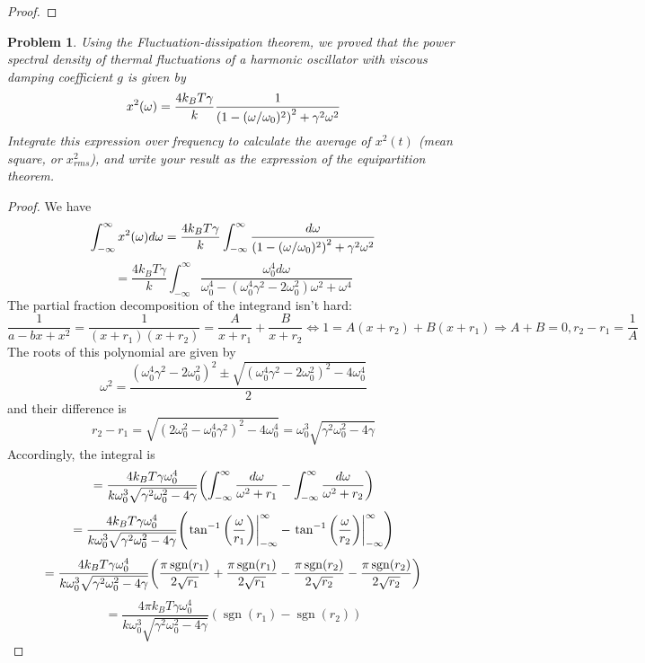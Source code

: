 \documentclass{article}
\newtheorem{plm}{Problem}
\DeclareMathOperator{\sgn}{sgn}
\begin{document}
\begin{proof}

\end{proof}

\begin{plm}
  Using the Fluctuation-dissipation theorem, we proved that the power spectral density of
  thermal fluctuations of a harmonic oscillator with viscous damping coefficient $g$ is given by
  \[
    x^{2}(\omega) = \frac{4k_{B}T\gamma}{k}\frac{1}{\qty(1 - (\omega / \omega_{0})^{2})^{2} + \gamma^{2}\omega^{2}}
  \]
  Integrate this expression over frequency to calculate the average of $x^{2}(t)$ (mean square, or $x^{2}_{rms}$),
  and write your result as the expression of the equipartition theorem.
\end{plm}

\begin{proof}
  We have
  \[
    \int_{-\infty}^{\infty}x^{2}(\omega)d\omega
    = \frac{4k_{B}T\gamma}{k}\int_{-\infty}^{\infty}\frac{d\omega}{\qty(1-(\omega/\omega_{0})^{2})^{2}+\gamma^{2}\omega^{2}}
  \]
  \[
    = \frac{4k_{B}T\gamma}{k}\int_{-\infty}^{\infty}\frac{\omega_{0}^{4}d\omega}{\omega_{0}^{4}
      - (\omega_{0}^{4}\gamma^{2}-2\omega_{0}^{2})\omega^{2} + \omega^{4}}
  \]
  The partial fraction decomposition of the integrand isn't hard:
  \[
    \frac{1}{a-bx+x^{2}} = \frac{1}{(x + r_{1})(x + r_{2})} = \frac{A}{x + r_{1}} + \frac{B}{x + r_{2}}
    \Leftrightarrow 1 = A(x+r_{2}) + B(x + r_{1}) \Rightarrow A+B = 0, r_{2}-r_{1} = \frac{1}{A}
  \]
  The roots of this polynomial are given by
  \[
    \omega^{2} = \frac{(\omega_{0}^{4}\gamma^{2} - 2\omega_{0}^{2})^{2} \pm \sqrt{(\omega_{0}^{4}\gamma^{2}-2\omega_{0}^{2})^{2}
        - 4\omega_{0}^{4}}}{2}
  \]
  and their difference is
  \[
    r_{2} - r_{1} =\sqrt{(2\omega_{0}^{2}-\omega_{0}^{4}\gamma^{2})^{2} - 4\omega_{0}^{4}} = \omega_{0}^{3}\sqrt{\gamma^{2}\omega_{0}^{2}-4\gamma}
  \]
  Accordingly, the integral is
  \[
    = \frac{4k_{B}T\gamma\omega_{0}^{4}}{k\omega_{0}^{3}\sqrt{\gamma^{2}\omega_{0}^{2}-4\gamma}}
    \qty(\int_{-\infty}^{\infty}\frac{d\omega}{\omega^{2} + r_{1}}
    - \int_{-\infty}^{\infty}\frac{d\omega}{\omega^{2} + r_{2}})
  \]
  \[
    = \frac{4k_{B}T\gamma\omega_{0}^{4}}{k\omega_{0}^{3}\sqrt{\gamma^{2}\omega_{0}^{2}-4\gamma}}
    \qty(\eval{\tan^{-1}\qty(\frac{\omega}{r_{1}})}_{-\infty}^{\infty} - \eval{\tan^{-1}\qty(\frac{\omega}{r_{2}})}_{-\infty}^{\infty})
  \]
  \[
    = \frac{4k_{B}T\gamma\omega_{0}^{4}}{k\omega_{0}^{3}\sqrt{\gamma^{2}\omega_{0}^{2}-4\gamma}}
    \qty(\frac{\pi\sgn(r_{1})}{2\sqrt{r_{1}}}+\frac{\pi\sgn(r_{1})}{2\sqrt{r_{1}}}
    - \frac{\pi\sgn(r_{2})}{2\sqrt{r_{2}}} - \frac{\pi\sgn(r_{2})}{2\sqrt{r_{2}}})
  \]
  \[
    = \frac{4\pi k_{B}T\gamma\omega_{0}^{4}}{k\omega_{0}^{3}\sqrt{\gamma^{2}\omega_{0}^{2}-4\gamma}}
    (\sgn(r_{1}) - \sgn(r_{2}))
  \]
\end{proof}
\end{document}
